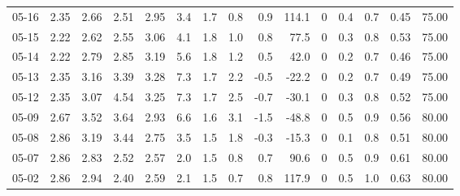 \begin{threeparttable}
{\begin{tabular}{lrrrrrrrrrrrrrr}
  05-16 &          2.35 &          2.66 &          2.51 &        2.95 &                 3.4 &                1.7 &                 0.8 &        0.9 &        114.1 &              0 &                 0.4 &              0.7 &            0.45 &                  75.00 \\
  05-15 &          2.22 &          2.62 &          2.55 &        3.06 &                 4.1 &                1.8 &                 1.0 &        0.8 &         77.5 &              0 &                 0.3 &              0.8 &            0.53 &                  75.00 \\
  05-14 &          2.22 &          2.79 &          2.85 &        3.19 &                 5.6 &                1.8 &                 1.2 &        0.5 &         42.0 &              0 &                 0.2 &              0.7 &            0.46 &                  75.00 \\
  05-13 &          2.35 &          3.16 &          3.39 &        3.28 &                 7.3 &                1.7 &                 2.2 &       -0.5 &        -22.2 &              0 &                 0.2 &              0.7 &            0.49 &                  75.00 \\
  05-12 &          2.35 &          3.07 &          4.54 &        3.25 &                 7.3 &                1.7 &                 2.5 &       -0.7 &        -30.1 &              0 &                 0.3 &              0.8 &            0.52 &                  75.00 \\
  05-09 &          2.67 &          3.52 &          3.64 &        2.93 &                 6.6 &                1.6 &                 3.1 &       -1.5 &        -48.8 &              0 &                 0.5 &              0.9 &            0.56 &                  80.00 \\
  05-08 &          2.86 &          3.19 &          3.44 &        2.75 &                 3.5 &                1.5 &                 1.8 &       -0.3 &        -15.3 &              0 &                 0.1 &              0.8 &            0.51 &                  80.00 \\
  05-07 &          2.86 &          2.83 &          2.52 &        2.57 &                 2.0 &                1.5 &                 0.8 &        0.7 &         90.6 &              0 &                 0.5 &              0.9 &            0.61 &                  80.00 \\
  05-02 &          2.86 &          2.94 &          2.40 &        2.59 &                 2.1 &                1.5 &                 0.7 &        0.8 &        117.9 &              0 &                 0.5 &              1.0 &            0.63 &                  80.00 \\

\end{tabular}}
\end{threeparttable}
